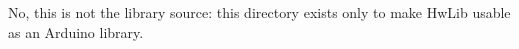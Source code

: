 No, this is not the library source\+: this directory exists only to make Hw\+Lib usable as an Arduino library. 